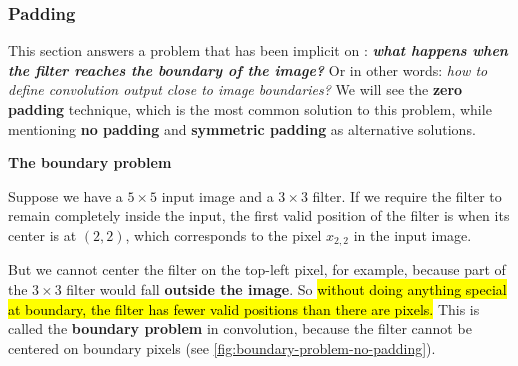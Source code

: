 \subsubsection{Padding}\label{sec:padding}

This section answers a problem that has been implicit on : \emph{\textbf{what happens when the filter reaches the boundary of the image?}} Or in other words: \emph{how to define convolution output close to image boundaries?} We will see the \textbf{zero padding} technique, which is the most common solution to this problem, while mentioning \textbf{no padding} and \textbf{symmetric padding} as alternative solutions.

\highspace
\begin{flushleft}
    \textcolor{Red2}{ \textbf{The boundary problem}}
\end{flushleft}
Suppose we have a $5\times 5$ input image and a $3\times 3$ filter. If we require the filter to remain completely inside the input, the first valid position of the filter is when its center is at $(2,2)$, which corresponds to the pixel $x_{2,2}$ in the input image.

\highspace
But we cannot center the filter on the top-left pixel, for example, because part of the $3 \times 3$ filter would fall \textbf{outside the image}. So \hl{without doing anything special at boundary, the filter has fewer valid positions than there are pixels.} This is called the \textbf{boundary problem} in convolution, because the filter cannot be centered on boundary pixels (see \autoref{fig:boundary-problem-no-padding}).

